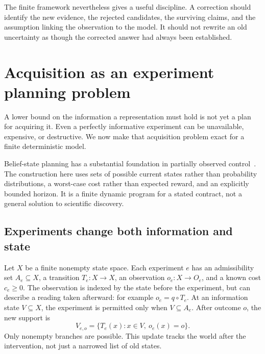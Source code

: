 \documentclass[11pt,letterpaper]{article}
\theoremstyle{plain}
\theoremstyle{definition}
\begin{document}
The finite framework nevertheless gives a useful discipline. A correction should identify the new evidence, the rejected candidates, the surviving claims, and the assumption linking the observation to the model. It should not rewrite an old uncertainty as though the corrected answer had always been established.

\section{Acquisition as an experiment planning problem}\label{sec:acquisition}
A lower bound on the information a representation must hold is not yet a plan for acquiring it. Even a perfectly informative experiment can be unavailable, expensive, or destructive. We now make that acquisition problem exact for a finite deterministic model.

Belief-state planning has a substantial foundation in partially observed control~\cite{smallwood}. The construction here uses sets of possible current states rather than probability distributions, a worst-case cost rather than expected reward, and an explicitly bounded horizon. It is a finite dynamic program for a stated contract, not a general solution to scientific discovery.

\subsection{Experiments change both information and state}
Let $X$ be a finite nonempty state space. Each experiment $e$ has an admissibility set $A_e\subseteq X$, a transition $T_e:X\to X$, an observation $o_e:X\to O_e$, and a known cost $c_e\geq0$. The observation is indexed by the state before the experiment, but can describe a reading taken afterward: for example $o_e=q\circ T_e$. At an information state $V\subseteq X$, the experiment is permitted only when $V\subseteq A_e$. After outcome $o$, the new support is
\begin{equation}\label{eq:acquisition-update}
V_{e,o}=\{T_e(x):x\in V,\ o_e(x)=o\}.
\end{equation}
Only nonempty branches are possible. This update tracks the world after the intervention, not just a narrowed list of old states.
\end{document}
